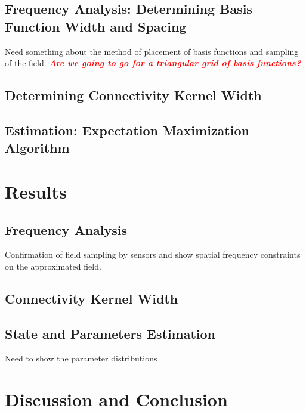 \documentclass[a4paper,10pt]{article}
\newcommand{\dean}[1]{\textsf{\emph{\textbf{\textcolor{red}{#1}}}}}
\begin{document}
\subsection{Frequency Analysis: Determining Basis Function Width and Spacing}
Need something about the method of placement of basis functions and sampling of the field. \dean{Are we going to go for a triangular grid of basis functions?}

\subsection{Determining Connectivity Kernel Width}

\subsection{Estimation: Expectation Maximization Algorithm}

\section{Results}

\subsection{Frequency Analysis}
Confirmation of field sampling by sensors and show spatial frequency constraints on the approximated field.

\subsection{Connectivity Kernel Width}

\subsection{State and Parameters Estimation}
Need to show the parameter distributions

\section{Discussion and Conclusion}
\end{document}
